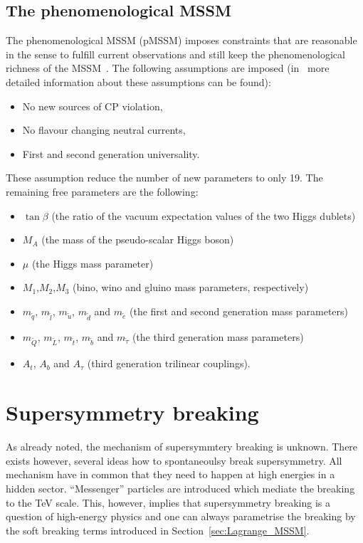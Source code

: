 \subsection{The phenomenological MSSM}
The phenomenological MSSM (pMSSM) imposes constraints that are reasonable in the sense to fulfill current observations and still keep the phenomenological richness of the MSSM~\cite{bib:pMSSM}.
The following assumptions are imposed (in~\cite{bib:pMSSM} more detailed information about these assumptions can be found):
\begin{itemize}
\item No new sources of CP violation,
\item No flavour changing neutral currents,
\item First and second generation universality.
\end{itemize}
These assumption reduce the number of new parameters to only 19.
The remaining free parameters are the following:
\begin{itemize}
\item $\tan \beta$ (the ratio of the vacuum expectation values of the two Higgs dublets)
\item $M_A$ (the mass of the pseudo-scalar Higgs boson)  
\item $\mu$ (the Higgs mass parameter)
\item $M_1$,$M_2$,$M_3$ (bino, wino and gluino mass parameters, respectively)
\item $m_{\tilde{q}}$, $m_{\tilde{l}}$, $m_{\tilde{u}}$, $m_{\tilde{d}}$ and $m_{\tilde{e}}$ (the first and second generation mass parameters)
\item  $m_{\tilde{Q}}$, $m_{\tilde{L}}$, $m_{\tilde{t}}$, $m_{\tilde{b}}$ and $m_{\tilde{\tau}}$ (the third generation mass parameters)
\item $A_t$, $A_b$ and $A_{\tau}$ (third generation trilinear couplings).
\end{itemize}

\section{Supersymmetry breaking}
As already noted, the mechanism of supersymmtery breaking is unknown.
There exists however, several ideas how to spontaneoulsy break supersymmetry.
All mechanism have in common that they need to happen at high energies in a hidden sector.
``Messenger'' particles are introduced which mediate the breaking to the TeV scale.
This, however, implies that supersymmetry breaking is a question of high-energy physics and one can always parametrise the breaking by the soft breaking terms introduced in Section~\ref{sec:Lagrange_MSSM}.

